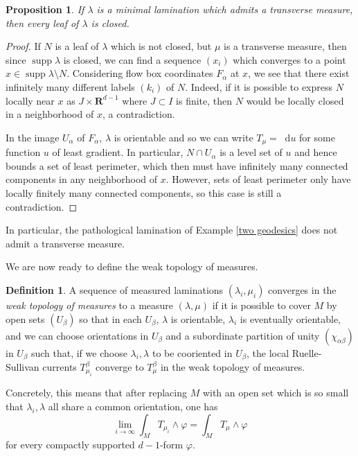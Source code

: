 \documentclass[reqno,11pt]{amsart}
\newcommand{\RR}{\mathbf{R}}
\newcommand*\dif{\mathop{}\!\mathrm{d}}
\DeclareMathOperator{\supp}{supp}
\newcommand{\dfn}[1]{\emph{#1}\index{#1}}
\newtheorem{proposition}[theorem]{Proposition}
\theoremstyle{definition}
\newtheorem{definition}[theorem]{Definition}
\numberwithin{equation}{section}
\begin{document}
\begin{proposition}
If $\lambda$ is a minimal lamination which admits a transverse measure, then every leaf of $\lambda$ is closed.
\end{proposition}
\begin{proof}
If $N$ is a leaf of $\lambda$ which is not closed, but $\mu$ is a transverse measure, then since $\supp \lambda$ is closed, we can find a sequence $(x_i)$ which converges to a point $x \in \supp \lambda \setminus N$.
Considering flow box coordinates $F_\alpha$ at $x$, we see that there exist infinitely many different labels $(k_i)$ of $N$.
Indeed, if it is possible to express $N$ locally near $x$ as $J \times \RR^{d - 1}$ where $J \subset I$ is finite, then $N$ would be locally closed in a neighborhood of $x$, a contradiction.

In the image $U_\alpha$ of $F_\alpha$, $\lambda$ is orientable and so we can write $T_\mu = \dif u$ for some function $u$ of least gradient.
In particular, $N \cap U_\alpha$ is a level set of $u$ and hence bounds a set of least perimeter, which then must have infinitely many connected components in any neighborhood of $x$.
However, sets of least perimeter only have locally finitely many connected components, so this case is still a contradiction.
\end{proof}

In particular, the pathological lamination of Example \ref{two geodesics} does not admit a transverse measure.

We are now ready to define the weak topology of measures.

\begin{definition}
A sequence of measured laminations $(\lambda_i, \mu_i)$ converges in the \dfn{weak topology of measures} to a measure $(\lambda, \mu)$ if it is possible to cover $M$ by open sets $(U_\beta)$ so that in each $U_\beta$, $\lambda$ is orientable, $\lambda_i$ is eventually orientable, and we can choose orientations in $U_\beta$ and a subordinate partition of unity $(\chi_{\alpha \beta})$ in $U_\beta$ such that, if we choose $\lambda_i, \lambda$ to be cooriented in $U_\beta$, the local Ruelle-Sullivan currents $T_{\mu_i}^\beta$ converge to $T_\mu^\beta$ in the weak topology of measures.
\end{definition}

Concretely, this means that after replacing $M$ with an open set which is so small that $\lambda_i, \lambda$ all share a common orientation, one has
$$\lim_{i \to \infty} \int_M T_{\mu_i} \wedge \varphi = \int_M T_\mu \wedge \varphi$$
for every compactly supported $d-1$-form $\varphi$.
\end{document}

